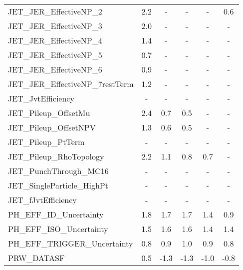 \begin{table}[htbp]
{\begin{tabular}{l | ccccc}
JET\_JER\_EffectiveNP\_2                     &   2.2 &     - &     - &     - &   0.6 \\
JET\_JER\_EffectiveNP\_3                     &   2.0 &     - &     - &     - &     - \\
JET\_JER\_EffectiveNP\_4                     &   1.4 &     - &     - &     - &     - \\
JET\_JER\_EffectiveNP\_5                     &   0.7 &     - &     - &     - &     - \\
JET\_JER\_EffectiveNP\_6                     &   0.9 &     - &     - &     - &     - \\
JET\_JER\_EffectiveNP\_7restTerm             &   1.2 &     - &     - &     - &     - \\
JET\_JvtEfficiency                         &     - &     - &     - &     - &     - \\
JET\_Pileup\_OffsetMu                       &   2.4 &   0.7 &   0.5 &     - &     - \\
JET\_Pileup\_OffsetNPV                      &   1.3 &   0.6 &   0.5 &     - &     - \\
JET\_Pileup\_PtTerm                         &     - &     - &     - &     - &     - \\
JET\_Pileup\_RhoTopology                    &   2.2 &   1.1 &   0.8 &   0.7 &     - \\
JET\_PunchThrough\_MC16                     &     - &     - &     - &     - &     - \\
JET\_SingleParticle\_HighPt                 &     - &     - &     - &     - &     - \\
JET\_fJvtEfficiency                        &     - &     - &     - &     - &     - \\
PH\_EFF\_ID\_Uncertainty                     &   1.8 &   1.7 &   1.7 &   1.4 &   0.9 \\
PH\_EFF\_ISO\_Uncertainty                    &   1.5 &   1.6 &   1.6 &   1.4 &   1.4 \\
PH\_EFF\_TRIGGER\_Uncertainty                &   0.8 &   0.9 &   1.0 &   0.9 &   0.8 \\
PRW\_DATASF                                &   0.5 &  -1.3 &  -1.3 &  -1.0 &  -0.8 \\

\end{tabular}
}
\end{table}

